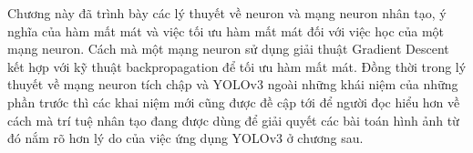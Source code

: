 Chương này đã trình bày các lý thuyết về neuron và mạng neuron nhân tạo, ý nghĩa của hàm mất mát và việc tối ưu hàm mất mát đối với việc học của một mạng neuron. Cách mà một mạng neuron sử dụng giải thuật Gradient Descent kết hợp với kỹ thuật backpropagation để tối ưu hàm mất mát. Đồng thời trong lý thuyết về mạng neuron tích chập và YOLOv3 ngoài những khái niệm của những phần trước thì các khai niệm mới cũng được đề cập tới để người đọc hiểu hơn về cách mà trí tuệ nhân tạo đang được dùng để giải quyết các bài toán hình ảnh từ đó nắm rõ hơn lý do của việc ứng dụng YOLOv3 ở chương sau.